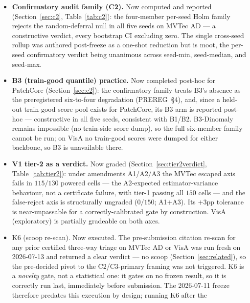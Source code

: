 \documentclass[11pt]{article}
\begin{document}
\begin{itemize}
  \item \textbf{Confirmatory audit family (C2).} Now computed and reported
        (Section~\ref{sec:c2}, Table~\ref{tab:c2}): the four-member per-seed Holm family rejects the
        random-deferral null in all five seeds on MVTec AD --- a constructive verdict, every
        bootstrap CI excluding zero. The single cross-seed rollup was authored post-freeze as a
        one-shot reduction but is moot, the per-seed confirmatory verdict being unanimous across
        seed-min, seed-median, and seed-max.
  \item \textbf{B3 (train-good quantile) practice.} Now completed post-hoc for PatchCore
        (Section~\ref{sec:c2}): the confirmatory family treats B3's absence as the preregistered
        six-to-four degradation (PREREG~\S4), and, since a held-out train-good score pool exists for
        PatchCore, its B3 arm is reported post-hoc --- constructive in all five seeds, consistent
        with B1/B2. B3-Dinomaly remains impossible (no train-side score dump), so the full
        six-member family cannot be run; on VisA no train-good scores were dumped for either
        backbone, so B3 is unavailable there.
  \item \textbf{V1 tier-2 as a verdict.} Now graded (Section~\ref{sec:tier2verdict},
        Table~\ref{tab:tier2}):
        under amendments A1/A2/A3 the MVTec escaped axis fails in $115/130$
        powered cells --- the A2-expected estimator-variance behaviour, not a certificate failure,
        with tier-1 passing all $150$ cells --- and the false-reject axis is structurally ungraded
        ($0/150$; A1$+$A3). Its $+3$pp tolerance is near-unpassable for a correctly-calibrated gate
        by construction. VisA (exploratory) is partially gradeable on both axes.
  \item K6 (scoop re-scan). Now executed. The pre-submission citation re-scan for any prior
        certified three-way triage on MVTec AD or VisA was run fresh on 2026-07-13 and returned a
        clear verdict --- no scoop (Section~\ref{sec:related}), so the pre-decided pivot to the
        C2/C3-primary framing was not triggered. K6 is a \emph{novelty} gate, not a statistical one:
        it gates on no frozen result, so it is correctly run last, immediately before submission.
        The 2026-07-11 freeze therefore predates this execution by design; running K6 after the

\end{itemize}
\end{document}

